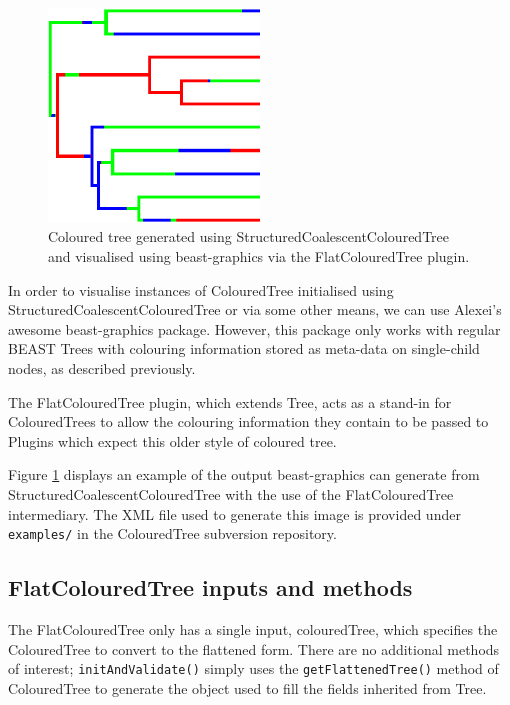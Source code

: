 \documentclass[a4paper,11pt]{paper}
\newcommand{\class}[1]{\textsf{#1}}
\newcommand{\project}[1]{\textsf{#1}}
\newcommand{\inp}[1]{\textsf{\color{blue}#1}}
\newcommand{\code}[1]{\texttt{#1}}
\begin{document}
\begin{figure}
	\centering
	\includegraphics[width=0.5\textwidth]{structuredCoalescentFig.pdf}
	\caption{Coloured tree generated using
		\class{StructuredCoalescentColouredTree} and visualised using
	\project{beast-graphics} via the \class{FlatColouredTree} plugin.}
	\label{fig:structuredCoalescent}
\end{figure}

In order to visualise instances of \class{ColouredTree} initialised
using \class{StructuredCoalescentColouredTree} or via some other
means, we can use Alexei's awesome \project{beast-graphics} package.
However, this package only works with regular BEAST \class{Tree}s
with colouring information stored as meta-data on single-child nodes,
as described previously.

The \class{FlatColouredTree} plugin, which extends \class{Tree}, acts
as a stand-in for \class{ColouredTree}s to allow the colouring
information they contain to be passed to \class{Plugin}s which expect
this older style of coloured tree.

Figure \ref{fig:structuredCoalescent} displays an example of the
output \project{beast-graphics} can generate from
\class{StructuredCoalescentColouredTree} with the use of the
\class{FlatColouredTree} intermediary. The XML file used to generate
this image is provided under \code{examples/} in the
\project{ColouredTree} subversion repository.

\subsection{FlatColouredTree inputs and methods}

The \class{FlatColouredTree} only has a single input,
\inp{colouredTree}, which specifies the \class{ColouredTree} to
convert to the flattened form. There are no additional methods of
interest; \code{initAndValidate()} simply uses the
\code{getFlattenedTree()} method of \class{ColouredTree} to generate
the object used to fill the fields inherited from \class{Tree}.
\end{document}

